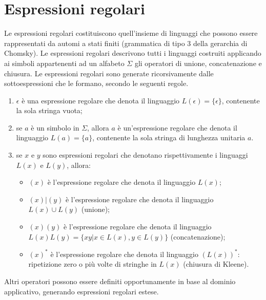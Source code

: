\section{Espressioni regolari}
Le espressioni regolari costituiscono quell'insieme di linguaggi che possono essere rappresentati da automi a stati finiti (grammatica di tipo 3 della gerarchia di Chomsky). Le espressioni regolari descrivono tutti i linguaggi costruiti applicando ai simboli appartenenti ad un alfabeto $\Sigma$ gli operatori di unione, concatenazione e chiusura. Le espressioni regolari sono generate ricorsivamente dalle sottoespressioni che le formano, secondo le seguenti regole.
\begin{enumerate}
\item $\epsilon$ è una espressione regolare che denota il linguaggio $L(\epsilon) = \{\epsilon\}$, 					contenente la sola stringa vuota;
\item se $a$  è un simbolo in $\Sigma$, allora $a$ è un'espressione regolare che denota il linguaggio $L(a) = 	\{a\}$, contenente la sola stringa di lunghezza unitaria $a$.
\item se $x$ e $y$ sono espressioni regolari che denotano rispettivamente i linguaggi $L(x)$ e $L(y)$, allora:
	\begin{itemize}
	\item $(x)$ è l'espressione regolare che denota il linguaggio $L(x)$;
	\item $(x) | (y)$ è l'espressione regolare che denota il linguaggio $L(x) \cup L(y)$ (unione);
	\item $(x)(y)$ è l'espressione regolare che denota il linguaggio $L(x)L(y) = \{xy | x \in L(x), y \in L(y)\}$ (concatenazione);
	\item $(x)^*$ è l'espressione regolare che denota il linguaggio $(L(x))^*$: ripetizione zero o più volte di stringhe in $L(x)$ (chiusura di Kleene).
	\end{itemize}
\end{enumerate}
Altri operatori possono essere definiti opportunamente in base al dominio applicativo, generando espressioni regolari estese.

